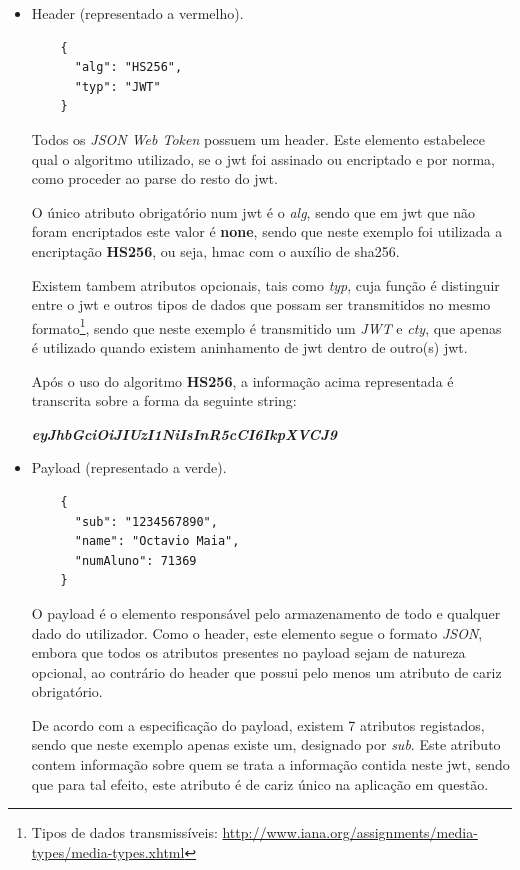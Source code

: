 \begin{itemize}
    \item Header (representado a vermelho).
    \begin{verbatim}
    {
      "alg": "HS256",
      "typ": "JWT"
    }
    \end{verbatim}
    
    Todos os \emph{JSON Web Token} possuem um header. Este elemento estabelece qual o algoritmo utilizado, se o \gls{jwt} foi assinado ou encriptado e por norma, como proceder ao parse do resto do \gls{jwt}.
    
    O único atributo obrigatório num \gls{jwt} é o \emph{alg}, sendo que em \gls{jwt} que não foram encriptados este valor é \textbf{none}, sendo que neste exemplo foi utilizada a encriptação \textbf{HS256}, ou seja, \gls{hmac} com o auxílio de \gls{sha256}.
    
    Existem tambem atributos opcionais, tais como \emph{typ}, cuja função é distinguir entre o \gls{jwt} e outros tipos de dados que possam ser transmitidos no mesmo formato\footnote{Tipos de dados transmissíveis: \url{http://www.iana.org/assignments/media-types/media-types.xhtml}}, sendo que neste exemplo é transmitido um \emph{JWT} e \emph{cty}, que apenas é utilizado quando existem aninhamento de \gls{jwt} dentro de outro(s) \gls{jwt}.
    
    Após o uso do algoritmo \textbf{HS256}, a informação acima representada é transcrita sobre a forma da seguinte string:
    
    \begin{center}
        \textbf{\emph{eyJhbGciOiJIUzI1NiIsInR5cCI6IkpXVCJ9}}
    \end{center}
    
    \newpage
    \item Payload (representado a verde).
    \begin{verbatim}
    {
      "sub": "1234567890",
      "name": "Octavio Maia",
      "numAluno": 71369
    }
    \end{verbatim}
    
    O payload é o elemento responsável pelo armazenamento de todo e qualquer dado do utilizador. Como o header, este elemento segue o formato \emph{JSON}, embora que todos os atributos presentes no payload sejam de natureza opcional, ao contrário do header que possui pelo menos um atributo de cariz obrigatório.
    
    De acordo com a especificação do payload, existem 7 atributos registados, sendo que neste exemplo apenas existe um, designado por \emph{sub}. Este atributo contem informação sobre quem se trata a informação contida neste \gls{jwt}, sendo que para tal efeito, este atributo é de cariz único na aplicação em questão.
    

\end{itemize}
